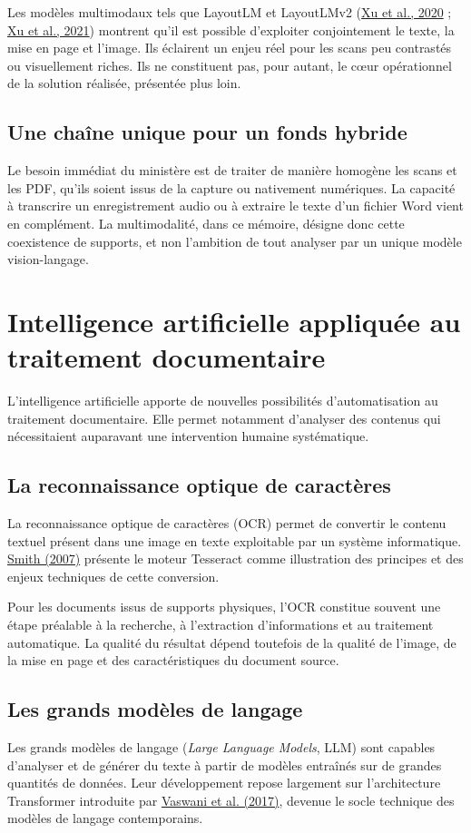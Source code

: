 \documentclass[12pt,a4paper]{report}
\newcommand{\citer}[2]{\hyperref[ref:#1]{#2}}
\begin{document}
Les modèles multimodaux tels que LayoutLM et LayoutLMv2 (\citer{xu2020}{Xu et al., 2020} ; \citer{xu2021}{Xu et al., 2021}) montrent qu'il est possible d'exploiter conjointement le texte, la mise en page et l'image. Ils éclairent un enjeu réel pour les scans peu contrastés ou visuellement riches. Ils ne constituent pas, pour autant, le cœur opérationnel de la solution réalisée, présentée plus loin.

\subsection{Une chaîne unique pour un fonds hybride}
Le besoin immédiat du ministère est de traiter de manière homogène les scans et les PDF, qu'ils soient issus de la capture ou nativement numériques. La capacité à transcrire un enregistrement audio ou à extraire le texte d'un fichier Word vient en complément. La multimodalité, dans ce mémoire, désigne donc cette coexistence de supports, et non l'ambition de tout analyser par un unique modèle vision-langage.

\section{Intelligence artificielle appliquée au traitement documentaire}
L'intelligence artificielle apporte de nouvelles possibilités d'automatisation au traitement documentaire. Elle permet notamment d'analyser des contenus qui nécessitaient auparavant une intervention humaine systématique.

\subsection{La reconnaissance optique de caractères}
La reconnaissance optique de caractères (OCR) permet de convertir le contenu textuel présent dans une image en texte exploitable par un système informatique. \citer{smith2007}{Smith (2007)} présente le moteur Tesseract comme illustration des principes et des enjeux techniques de cette conversion.

Pour les documents issus de supports physiques, l'OCR constitue souvent une étape préalable à la recherche, à l'extraction d'informations et au traitement automatique. La qualité du résultat dépend toutefois de la qualité de l'image, de la mise en page et des caractéristiques du document source.

\subsection{Les grands modèles de langage}
Les grands modèles de langage (\textit{Large Language Models}, LLM) sont capables d'analyser et de générer du texte à partir de modèles entraînés sur de grandes quantités de données. Leur développement repose largement sur l'architecture Transformer introduite par \citer{vaswani2017}{Vaswani et al. (2017)}, devenue le socle technique des modèles de langage contemporains.
\end{document}
